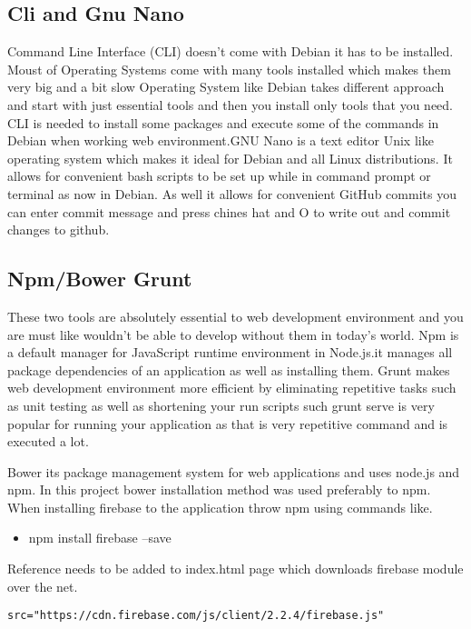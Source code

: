 \subsection{Cli and Gnu Nano}
\bigbreak
Command Line Interface (CLI) doesn’t come with Debian it has to be installed. Moust of Operating Systems come with many tools installed which makes them very big and a bit slow Operating System like Debian takes different approach and start with just essential tools and then you install only tools that you need. CLI is needed to install some packages and execute some of the commands in Debian when working web environment.GNU Nano is a text editor Unix like operating system which makes it ideal for Debian and all Linux distributions. It allows for convenient bash scripts to be set up while in command prompt or terminal as now in Debian. As well it allows for convenient GitHub commits you can enter commit message and press chines hat and O to write out and commit changes to github.


\subsection{Npm/Bower Grunt}
\bigbreak
These two tools are absolutely essential to web development environment and you are must like wouldn’t be able to develop without them in today’s world. Npm is a default manager for JavaScript runtime environment in Node.js.it manages all package dependencies of an application as well as installing them. Grunt makes web development environment more efficient by eliminating repetitive tasks such as unit testing as well as shortening your run scripts such grunt serve is very popular for running your application as that is very repetitive command and is executed a lot.


\bigbreak

Bower its package management system for web applications and uses node.js and npm.
In this project bower installation method was used preferably to npm. When installing firebase to the application throw npm using commands like.

\begin{itemize}
	\item npm install firebase –save
\end{itemize}
Reference needs to be added to index.html page which downloads firebase module over the net.


\begin{verbatim}
src="https://cdn.firebase.com/js/client/2.2.4/firebase.js"
\end{verbatim}




